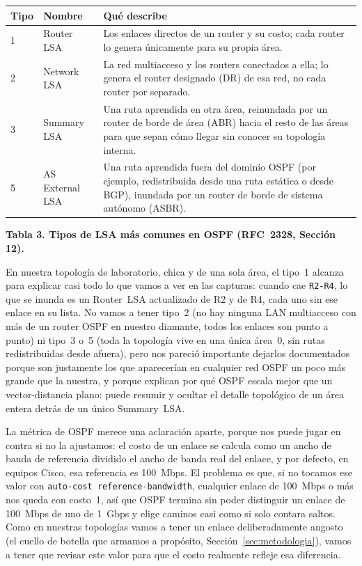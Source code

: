 \documentclass[11pt,a4paper]{article}
\newcommand{\figcaption}[1]{\par\noindent\footnotesize\textbf{#1}\par\vspace{0.4cm}}
\begin{document}
\needspace{1cm}
\begin{center}
\begin{minipage}{0.9\linewidth}
\centering
\small
\begin{tabular}{@{}p{1.3cm}p{3.1cm}p{8.4cm}@{}}
\toprule
\textbf{Tipo} & \textbf{Nombre} & \textbf{Qu\'e describe} \\
\midrule
1 & Router LSA & Los enlaces directos de un router y su costo; cada router lo genera \'unicamente para su propia \'area. \\
2 & Network LSA & La red multiacceso y los routers conectados a ella; lo genera el router designado (DR) de esa red, no cada router por separado. \\
3 & Summary LSA & Una ruta aprendida en otra \'area, reinundada por un router de borde de \'area (ABR) hacia el resto de las \'areas para que sepan c\'omo llegar sin conocer su topolog\'ia interna. \\
5 & AS External LSA & Una ruta aprendida fuera del dominio OSPF (por ejemplo, redistribuida desde una ruta est\'atica o desde BGP), inundada por un router de borde de sistema aut\'onomo (ASBR). \\
\bottomrule
\end{tabular}
\par\vspace{0.1cm}
\figcaption{Tabla 3. Tipos de LSA m\'as comunes en OSPF (RFC~2328, Secci\'on 12).}
\end{minipage}
\end{center}

En nuestra topolog\'ia de laboratorio, chica y de una sola \'area, el tipo~1 alcanza para explicar casi todo lo que vamos a ver en las capturas: cuando cae \texttt{R2-R4}, lo que se inunda es un Router~LSA actualizado de R2 y de R4, cada uno sin ese enlace en su lista. No vamos a tener tipo~2 (no hay ninguna LAN multiacceso con m\'as de un router OSPF en nuestro diamante, todos los enlaces son punto a punto) ni tipo~3 o~5 (toda la topolog\'ia vive en una \'unica \'area~0, sin rutas redistribuidas desde afuera), pero nos pareci\'o importante dejarlos documentados porque son justamente los que aparecer\'ian en cualquier red OSPF un poco m\'as grande que la nuestra, y porque explican por qu\'e OSPF escala mejor que un vector-distancia plano: puede resumir y ocultar el detalle topol\'ogico de un \'area entera detr\'as de un \'unico Summary~LSA.

La m\'etrica de OSPF merece una aclaraci\'on aparte, porque nos puede jugar en contra si no la ajustamos: el costo de un enlace se calcula como un ancho de banda de referencia dividido el ancho de banda real del enlace, y por defecto, en equipos Cisco, esa referencia es 100~Mbps. El problema es que, si no tocamos ese valor con \texttt{auto-cost reference-bandwidth}, cualquier enlace de 100~Mbps o m\'as nos queda con costo~1, as\'i que OSPF termina sin poder distinguir un enlace de 100~Mbps de uno de 1~Gbps y elige caminos casi como si solo contara saltos. Como en nuestras topolog\'ias vamos a tener un enlace deliberadamente angosto (el cuello de botella que armamos a prop\'osito, Secci\'on~\ref{sec:metodologia}), vamos a tener que revisar este valor para que el costo realmente refleje esa diferencia.
\end{document}
